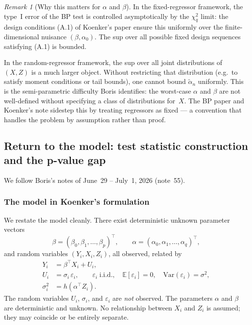 \documentclass[a4paper,oneside,12pt]{extarticle}
\theoremstyle{plain}
\theoremstyle{definition}
\theoremstyle{remark}
\newtheorem{remark}[proposition]{Remark}
\newcommand*{\E}{\mathbb{E}}
\newcommand*{\Var}{\mathrm{Var}}
\begin{document}
\begin{remark}[Why this matters for $\alpha$ and $\beta$]
In the fixed-regressor framework, the type~I error of the BP test is
controlled asymptotically by the $\chi^2_q$ limit: the design
conditions (A.1) of Koenker's paper ensure this uniformly over the
finite-dimensional nuisance $(\beta,\alpha_0)$.  The sup over all
possible fixed design sequences satisfying (A.1) is bounded.

In the random-regressor framework, the sup over all joint distributions
of $(X,Z)$ is a much larger object.  Without restricting that
distribution (e.g.\ to satisfy moment conditions or tail bounds), one
cannot bound $\tilde\alpha_n$ uniformly.  This is the semi-parametric
difficulty Boris identifies: the worst-case $\alpha$ and $\beta$ are
not well-defined without specifying a class of distributions for~$X$.
The BP paper and Koenker's note sidestep this by treating regressors as
fixed — a convention that handles the problem by assumption rather than
proof.
\end{remark}


\subsection{Return to the model: test statistic construction and the p-value gap}
\label{subsec:back-to-test}

We follow Boris's notes of June~29 -- July~1, 2026 (note~55).

\subsubsection*{The model in Koenker's formulation}

We restate the model cleanly.  There exist deterministic unknown
parameter vectors
\[
  \beta = (\beta_0, \beta_1, \ldots, \beta_p)^\top,
  \qquad
  \alpha = (\alpha_0, \alpha_1, \ldots, \alpha_q)^\top,
\]
and random variables $(Y_i, X_i, Z_i)$, all observed, related by
\begin{align*}
  Y_i &= \beta^\top X_i + U_i, \\
  U_i &= \sigma_i\,\varepsilon_i, \qquad \varepsilon_i \;\text{i.i.d.},
  \quad \E[\varepsilon_i]=0,\quad \Var(\varepsilon_i)=\sigma^2, \\
  \sigma_i^2 &= h(\alpha^\top Z_i).
\end{align*}
The random variables $U_i$, $\sigma_i$, and $\varepsilon_i$ are
\emph{not} observed.  The parameters $\alpha$ and $\beta$ are
deterministic and unknown.  No relationship between $X_i$ and $Z_i$ is
assumed; they may coincide or be entirely separate.
\end{document}
